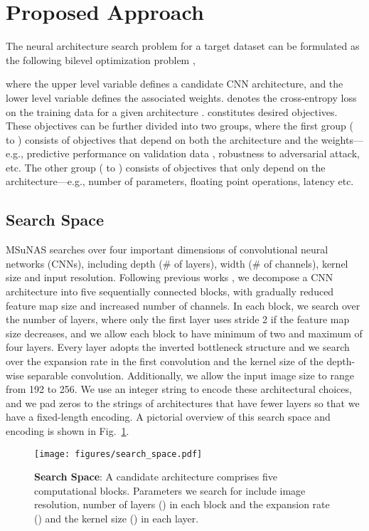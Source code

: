 \documentclass[runningheads]{llncs}
\def\ourmethod{MSuNAS}
\begin{document}
 \section{Proposed Approach \label{sec:approach}}

The neural architecture search problem for a target dataset  can be formulated as the following bilevel optimization problem \cite{bilevel},

where the upper level variable  defines a candidate CNN architecture, and the lower level variable  defines the associated weights.  denotes the cross-entropy loss on the training data  for a given architecture .  constitutes  desired objectives. These objectives can be further divided into two groups, where the first group ( to ) consists of objectives that depend on both the architecture and the weights---e.g., predictive performance on validation data , robustness to adversarial attack, etc. The other group ( to ) consists of objectives that only depend on the architecture---e.g., number of parameters, floating point operations, latency etc.

\subsection{Search Space}
\ourmethod{} searches over four important dimensions of convolutional neural networks (CNNs), including depth (\# of layers), width (\# of channels), kernel size and input resolution. Following previous works \cite{mnasnet,mobilenetv3,onceforall}, we decompose a CNN architecture into five sequentially connected blocks, with gradually reduced feature map size and increased number of channels. In each block, we search over the number of layers, where only the first layer uses stride 2 if the feature map size decreases, and we allow each block to have minimum of two and maximum of four layers. Every layer adopts the inverted bottleneck structure \cite{mobilenetv2} and we search over the expansion rate in the first  convolution and the kernel size of the depth-wise separable convolution. Additionally, we allow the input image size to range from 192 to 256. We use an integer string to encode these architectural choices, and we pad zeros to the strings of architectures that have fewer layers so that we have a fixed-length encoding. A pictorial overview of this search space and encoding is shown in Fig.~\ref{fig:search_space}.

\begin{figure}[t]
    \centering
    \texttt{[image: figures/search\_space.pdf]}
    \caption{\textbf{Search Space}: A candidate architecture comprises five computational blocks. Parameters we search for include image resolution, number of layers () in each block and the expansion rate () and the kernel size () in each layer.
    \label{fig:search_space}}
\end{figure}
\end{document}
